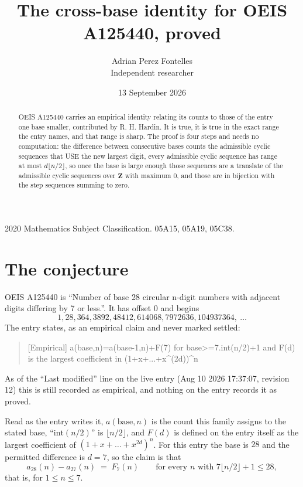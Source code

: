 \documentclass[11pt,a4paper]{article}
\title{The cross-base identity for OEIS A125440, proved}
\author{Adrian Perez Fontelles\\ \small Independent researcher}
\date{13 September 2026}
\theoremstyle{plain}
\theoremstyle{definition}
\begin{document}
\maketitle

\begin{abstract}
OEIS A125440 carries an empirical identity relating its counts to those of the entry one base
smaller, contributed by R. H. Hardin. It is true, it is true in the exact range the entry
names, and that range is sharp. The proof is four steps and needs no computation: the
difference between consecutive bases counts the admissible cyclic sequences that USE the new
largest digit, every admissible cyclic sequence has range at most $d\lfloor n/2\rfloor$, so
once the base is large enough those sequences are a translate of the admissible cyclic
sequences over $\mathbf{Z}$ with maximum $0$, and those are in bijection with the step
sequences summing to zero.
\end{abstract}

\noindent\small 2020 Mathematics Subject Classification. 05A15, 05A19, 05C38.\normalsize

\section{The conjecture}

OEIS A125440 is ``Number of base 28 circular n-digit numbers with adjacent digits differing by 7 or less.''. It has offset $0$ and begins
\[
1, 28, 364, 3892, 48412, 614068, 7972636, 104937364,\ \dots
\]
The entry states, as an empirical claim and never marked settled:
\begin{quote}
[Empirical] a(base,n)=a(base-1,n)+F(7) for base>=7.int(n/2)+1 and F(d) is the largest coefficient in (1+x+...+x\textasciicircum{}(2d))\textasciicircum{}n
\end{quote}
As of the ``Last modified'' line on the live entry (Aug 10 2026 17:37:07, revision 12)
this is still recorded as empirical, and nothing on the entry records it as proved.

Read as the entry writes it, $a(\mathrm{base},n)$ is the count this family assigns to the
stated base, ``$\mathrm{int}(n/2)$'' is $\lfloor n/2\rfloor$, and $F(d)$ is defined on the
entry itself as the largest coefficient of $(1+x+\dots+x^{2d})^{n}$. For this entry
the base is $28$ and the permitted difference is $d=7$, so the claim is that
\[
a_{28}(n)-a_{27}(n)\;=\;F_{7}(n)
\qquad\text{for every } n \text{ with } 7\lfloor n/2\rfloor+1\le28,
\]
that is, for $1\le n\le7$.
\end{document}
